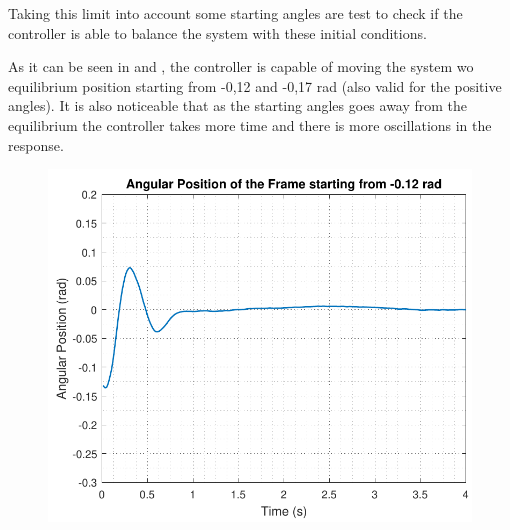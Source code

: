 Taking this limit into account some starting angles are test to check if the controller is able to balance the system with these initial conditions. 

As it can be seen in  and , the controller is capable of moving the system wo equilibrium position starting from -0,12 and -0,17 rad (also valid for the positive angles). It is also noticeable that as the starting angles goes away from the equilibrium the controller takes more time and there is more oscillations in the response.

\begin{minipage}{\linewidth}
	\begin{minipage}{0.45\linewidth}
		\begin{figure}[H]
			\includegraphics[scale=.55]{figures/testCatch_12}
			\centering
			\captionsetup{justification=centering}
			\label{testCatch_12}
		\end{figure}
	\end{minipage}
	\hspace{0.03\linewidth}
	\begin{minipage}{0.45\linewidth}
		\begin{figure}[H]\vspace{-3mm}

\end{figure}
\end{minipage}
\end{minipage}
